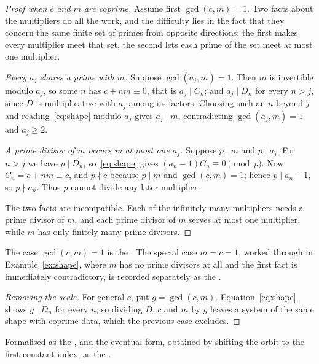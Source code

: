 \documentclass[11pt]{article}
\begin{document}
\begin{proof}[Proof when $c$ and $m$ are coprime]
Assume first $\gcd(c,m)=1$.  Two facts about the multipliers do all the work,
and the difficulty lies in the fact that they concern the same finite set of
primes from opposite directions: the first makes every multiplier meet that
set, the second lets each prime of the set meet at most one multiplier.

\emph{Every $a_j$ shares a prime with $m$.}  Suppose $\gcd(a_j,m)=1$.  Then
$m$ is invertible modulo $a_j$, so some $n$ has $c+nm\equiv0$, that is
$a_j\mid C_n$; and $a_j\mid D_n$ for every $n>j$, since $D$ is multiplicative
with $a_j$ among its factors.  Choosing such an $n$ beyond $j$
and reading~\eqref{eq:shape} modulo $a_j$ gives $a_j\mid m$, contradicting
$\gcd(a_j,m)=1$ and $a_j\ge2$.

\emph{A prime divisor of $m$ occurs in at most one $a_j$.}  Suppose $p\mid m$
and $p\mid a_j$.  For $n>j$ we have $p\mid D_n$, so~\eqref{eq:shape} gives
$(a_n-1)C_n\equiv0 \pmod p$.  Now $C_n=c+nm\equiv c$, and $p\nmid c$ because
$p\mid m$ and $\gcd(c,m)=1$; hence $p\mid a_n-1$, so $p\nmid a_n$.  Thus $p$
cannot divide any later multiplier.

The two facts are incompatible.  Each of the infinitely many multipliers needs
a prime divisor of $m$, and each prime divisor of $m$ serves at most one
multiplier, while $m$ has only finitely many prime divisors.
\end{proof}

\noindent The case $\gcd(c,m)=1$ is the
.  The special case $m=c=1$, worked through in
Example~\ref{ex:shape}, where $m$ has no prime divisors at all and the first
fact is immediately contradictory, is recorded separately as the
.

\begin{proof}[Removing the scale]
For general $c$, put $g=\gcd(c,m)$.  Equation~\eqref{eq:shape} shows
$g\mid D_n$ for every $n$, so dividing $D$, $c$ and $m$ by $g$ leaves a system
of the same shape with coprime data, which the previous case excludes.
\end{proof}

\noindent Formalised as the
, and the eventual form, obtained by shifting the orbit to the
first constant index, as the
.
\end{document}
